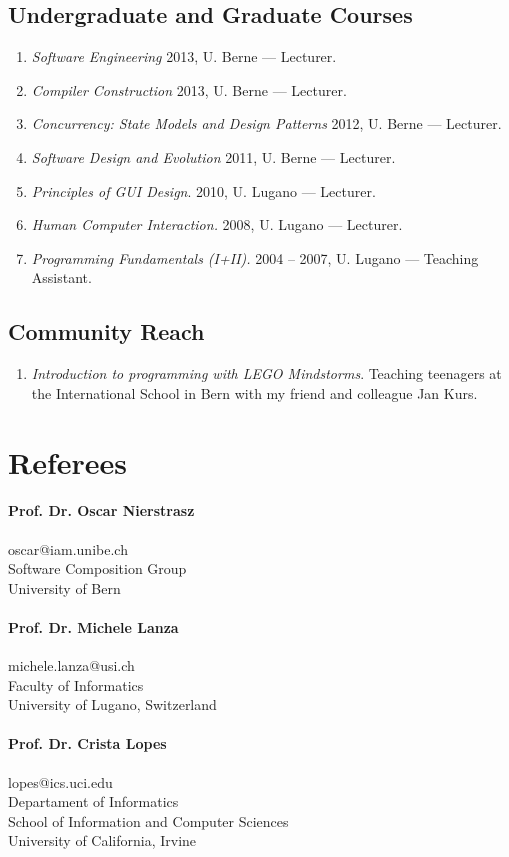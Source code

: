 \documentclass[a4paper]{article}
\begin{document}
\subsection{Undergraduate and Graduate Courses}
\begin{enumerate}
	\item {\em Software Engineering} 2013, U. Berne --- Lecturer.
	\item {\em Compiler Construction} 2013, U. Berne --- Lecturer.
	\item {\em Concurrency: State Models and Design Patterns} 2012, U. Berne --- Lecturer.
	\item {\em Software Design and Evolution} 2011, U. Berne --- Lecturer.
	\item {\em Principles of GUI Design}. 2010, U. Lugano --- Lecturer.
	\item {\em Human Computer Interaction.} 2008, U. Lugano --- Lecturer.
	\item {\em Programming Fundamentals (I+II).} 2004 -- 2007, U. Lugano --- Teaching Assistant.
\end{enumerate}



\subsection {Community Reach}
\begin{enumerate}
	\item \emph{Introduction to programming with LEGO Mindstorms}. Teaching teenagers at the International School in Bern with my friend and colleague Jan Kurs.
\end{enumerate}






\section{Referees}


\paragraph{Prof. Dr. Oscar Nierstrasz\\}
{oscar@iam.unibe.ch\\
Software Composition Group\\ 
University of Bern}

\paragraph{Prof. Dr. Michele Lanza\\}
{michele.lanza@usi.ch\\
Faculty of Informatics\\
University of Lugano, Switzerland}

\paragraph{Prof. Dr. Crista Lopes\\}
{lopes@ics.uci.edu\\
Departament of Informatics\\
School of Information and Computer Sciences\\
University of California, Irvine
}
	

% 
\end{document}
